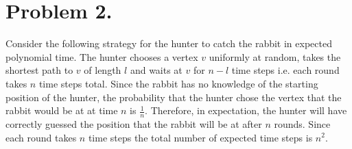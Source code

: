 \documentclass[12pt]{article}
\begin{document}
\pagestyle{plain}
\titleformat{\subsection}[runin]
  {\normalfont\large\bfseries}{\thesubsection}{1em}{}
\titleformat{\subsubsection}[runin]
  {\normalfont\large\bfseries}{\thesubsubsection}{1em}{}

\section*{Problem 2.}
Consider the following strategy for the hunter to catch the rabbit in
expected polynomial time. The hunter chooses a vertex $v$ uniformly at random,
takes the shortest path to $v$ of length $l$ and waits at $v$ for $n-l$ time
steps i.e. each round takes $n$ time steps total. Since the rabbit has no
knowledge of the starting position of the hunter, the probability that the
hunter chose the vertex that the rabbit would be at at time $n$ is $\frac{1}{n}$.
Therefore, in expectation, the hunter will have correctly guessed the position
that the rabbit will be at after $n$ rounds. Since each round takes $n$ time
steps the total number of expected time steps is $n^2$.
\end{document}
